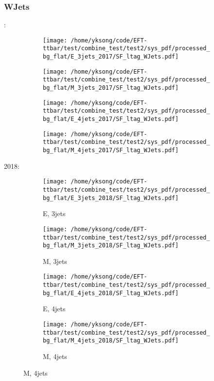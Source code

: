 \documentclass{beamer}
\begin{document}
\begin{frame}
\frametitle{WJets}
\fontsize{5}{1}:
\begin{figure}
\centering
\begin{subfigure}[b]{0.24\textwidth}
\texttt{[image: /home/yksong/code/EFT-ttbar/test/combine\_test/test2/sys\_pdf/processed\_bg\_flat/E\_3jets\_2017/SF\_ltag\_WJets.pdf]}
\end{subfigure}
\begin{subfigure}[b]{0.24\textwidth}
\texttt{[image: /home/yksong/code/EFT-ttbar/test/combine\_test/test2/sys\_pdf/processed\_bg\_flat/M\_3jets\_2017/SF\_ltag\_WJets.pdf]}
\end{subfigure}
\begin{subfigure}[b]{0.24\textwidth}
\texttt{[image: /home/yksong/code/EFT-ttbar/test/combine\_test/test2/sys\_pdf/processed\_bg\_flat/E\_4jets\_2017/SF\_ltag\_WJets.pdf]}
\end{subfigure}
\begin{subfigure}[b]{0.24\textwidth}
\texttt{[image: /home/yksong/code/EFT-ttbar/test/combine\_test/test2/sys\_pdf/processed\_bg\_flat/M\_4jets\_2017/SF\_ltag\_WJets.pdf]}
\end{subfigure}
\end{figure}
2018:
\begin{figure}
\centering
\begin{subfigure}[b]{0.24\textwidth}
\texttt{[image: /home/yksong/code/EFT-ttbar/test/combine\_test/test2/sys\_pdf/processed\_bg\_flat/E\_3jets\_2018/SF\_ltag\_WJets.pdf]}
\captionsetup{font=tiny}
\caption{E, 3jets}
\end{subfigure}
\begin{subfigure}[b]{0.24\textwidth}
\texttt{[image: /home/yksong/code/EFT-ttbar/test/combine\_test/test2/sys\_pdf/processed\_bg\_flat/M\_3jets\_2018/SF\_ltag\_WJets.pdf]}
\captionsetup{font=tiny}
\caption{M, 3jets}
\end{subfigure}
\begin{subfigure}[b]{0.24\textwidth}
\texttt{[image: /home/yksong/code/EFT-ttbar/test/combine\_test/test2/sys\_pdf/processed\_bg\_flat/E\_4jets\_2018/SF\_ltag\_WJets.pdf]}
\captionsetup{font=tiny}
\caption{E, 4jets}
\end{subfigure}
\begin{subfigure}[b]{0.24\textwidth}
\texttt{[image: /home/yksong/code/EFT-ttbar/test/combine\_test/test2/sys\_pdf/processed\_bg\_flat/M\_4jets\_2018/SF\_ltag\_WJets.pdf]}
\captionsetup{font=tiny}
\caption{M, 4jets}
\end{subfigure}
\end{figure}
\end{frame}
\end{document}
